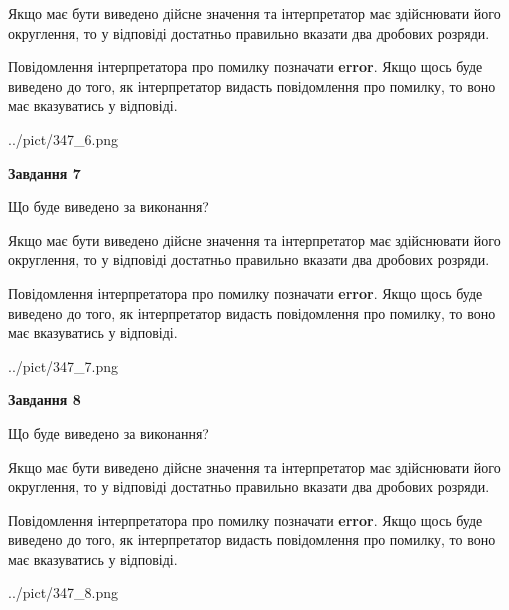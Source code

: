 \documentclass[12pt, ukrainian]{article}
\begin{document}
{\begin {Large}
Якщо має бути виведено дійсне значення та інтерпретатор має здійснювати його округлення, 
то у відповіді достатньо правильно вказати два дробових розряди.

Повідомлення інтерпретатора про помилку позначати \textbf{error}.
Якщо щось буде виведено до того, як інтерпретатор видасть повідомлення про помилку, 
то воно має вказуватись у відповіді. \par

\begin{center}
	{../pict/347_6.png}
\end{center}
\newpage

{\begin {center}\textbf{Завдання 7}\end {center}}\par
Що буде виведено за виконання? \par

Якщо має бути виведено дійсне значення та інтерпретатор має здійснювати його округлення, 
то у відповіді достатньо правильно вказати два дробових розряди.

Повідомлення інтерпретатора про помилку позначати \textbf{error}.
Якщо щось буде виведено до того, як інтерпретатор видасть повідомлення про помилку, 
то воно має вказуватись у відповіді. \par

\begin{center}
	{../pict/347_7.png}
\end{center}
\newpage

{\begin {center}\textbf{Завдання 8}\end {center}}\par
Що буде виведено за виконання? \par

Якщо має бути виведено дійсне значення та інтерпретатор має здійснювати його округлення, 
то у відповіді достатньо правильно вказати два дробових розряди.

Повідомлення інтерпретатора про помилку позначати \textbf{error}.
Якщо щось буде виведено до того, як інтерпретатор видасть повідомлення про помилку, 
то воно має вказуватись у відповіді. \par

\begin{center}
	{../pict/347_8.png}
\end{center}
\newpage


\end{Large}}
\end{document}
